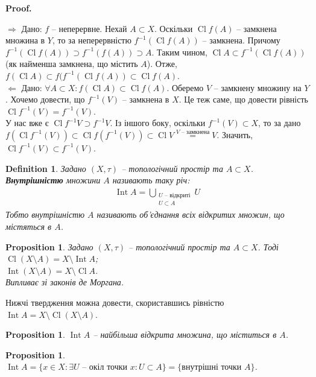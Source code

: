 \documentclass[a4paper, 10pt]{article}
\makeatletter
\def\rightproof{$\boxed{\Rightarrow}$ }
\def\leftproof{$\boxed{\Leftarrow}$ }
\theoremstyle{theoremdd}
\newtheorem{definition}[theorem]{Definition}
\newtheorem{proposition}[theorem]{Proposition}
\DeclareMathOperator{\Cl}{Cl}
\DeclareMathOperator{\Int}{Int}
\renewenvironment{proof}[1][Proof.\\]{\par
\pushQED{\hfill \qed}%
\normalfont \topsep6\p@\@plus6\p@\relax
\trivlist
\item\relax
{\bfseries
#1\@addpunct{.}}\hspace\labelsep\ignorespaces
}{%
\popQED\endtrivlist\@endpefalse
}
\makeatother
\begin{document}
\begin{proof}
\rightproof Дано: $f$ -- неперервне. Нехай $A \subset X$. Оскільки $\Cl f(A)$ -- замкнена множина в $Y$, то за неперервністю $f^{-1} (\Cl f(A))$ -- замкнена. Причому $f^{-1}(\Cl f(A)) \supset f^{-1} (f(A)) \supset A$. Таким чином, $\Cl A \subset f^{-1} (\Cl f(A))$ (як найменша замкнена, що містить $A$). Отже, $f(\Cl A) \subset f(f^{-1}(\Cl f(A)) \subset \Cl f(A)$.
\bigskip \\
\leftproof Дано: $\forall A \subset X: f(\Cl A) \subset \Cl f(A)$. Оберемо $V$ -- замкнену множину на $Y$. Хочемо довести, що $f^{-1}(V)$ -- замкнена в $X$. Це теж саме, що довести рівність $\Cl f^{-1}(V) = f^{-1}(V)$.\\
У нас вже є $\Cl f^{-1} V \supset f^{-1} V$. Із іншого боку, оскільки $f^{-1}(V) \subset X$, то за дано $f(\Cl f^{-1}(V)) \subset \Cl f(f^{-1}(V)) \subset \Cl V \overset{\text{$V$ -- замкнена}}{=} V$. Значить, $\Cl f^{-1}(V) \subset f^{-1}(V)$.
\end{proof}

\begin{definition}
Задано $(X,\tau)$ -- топологічний простір та $A \subset X$.\\
\textbf{Внутрішністю} множини $A$ називають таку річ:
\begin{align*}
\Int A = \bigcup_{\substack{\text{$U$ -- відкриті} \\ U \subset A}} U
\end{align*}
Тобто внутрішністю $A$ називають об'єднання всіх відкритих множин, що містяться в $A$.
\end{definition}

\begin{proposition}
Задано $(X,\tau)$ -- топологічний простір та $A \subset X$. Тоді\\
$\Cl(X \setminus A) = X \setminus \Int A$;\\
$\Int (X \setminus A) = X \setminus \Cl A$.\\
\textit{Випливає зі законів де Моргана.}
\end{proposition}
\noindent
Нижчі твердження можна довести, скориставшись рівністю $\Int A = X \setminus \Cl (X \setminus A)$.

\begin{proposition}
$\Int A$ -- найбільша відкрита множина, що міститься в $A$.
\end{proposition}

\begin{proposition}
$\Int A = \{x \in X: \exists \text{$U$ -- окіл точки $x$}: U \subset A\} = \{ \text{внутрішні точки $A$}\}$.
\end{proposition}
\end{document}
